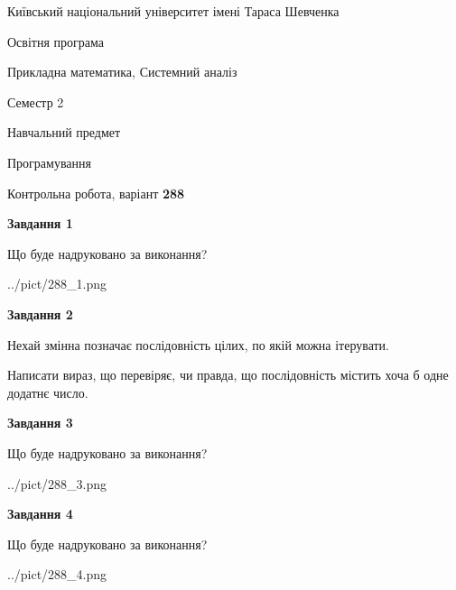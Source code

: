 \documentclass[12pt, ukrainian]{article}
\begin{document}
{{\begin {small}\par
{ \center  Київський національний університет імені Тараса Шевченка \par}
{\parbox {5 cm}{Освітня програма \hfill}{\parbox {8 cm}{Прикладна математика, Системний аналіз \hfill}}\parbox {5 cm}{\hfill Семестр 2}}\par
{\parbox {5 cm} {Навчальний предмет \hfill}\parbox {7 cm}{Програмування \hfill}\parbox {6cm}{\hfill}\par}\vspace{-7pt} \end{small}}{\center Контрольна робота, варіант  \No \textbf
{ 288 }\par}}
{
\begin {large}
{\begin {center}\textbf{Завдання 1}\end {center}}\par
Що буде надруковано за виконання?\par\par
\begin{center}
	{../pict/288_1.png}
\end{center}
\newpage

{\begin {center}\textbf{Завдання 2}\end {center}}\par
Нехай змінна  позначає послідовність цілих, по якій можна ітерувати.

Написати вираз, що перевіряє, чи правда, що послідовність  містить хоча б одне додатнє число.\par
\newpage

{\begin {center}\textbf{Завдання 3}\end {center}}\par
Що буде надруковано за виконання?
\begin{center}
	{../pict/288_3.png}
\end{center}
\newpage

{\begin {center}\textbf{Завдання 4}\end {center}}\par
Що буде надруковано за виконання?\par
\begin{center}
	{../pict/288_4.png}
\end{center}
\newpage


\end{large}}
\end{document}
